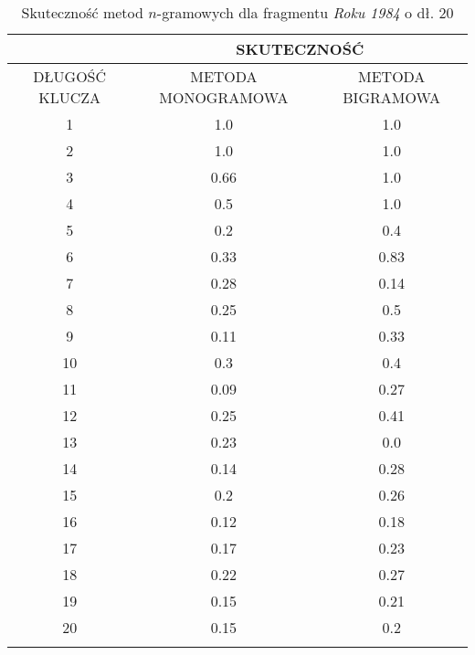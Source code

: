 \documentclass[a4paper]{article}
\theoremstyle{defn}
\theoremstyle{theorem}
\theoremstyle{lemma}
\theoremstyle{cor}
\theoremstyle{fact}
\begin{document}
\begin{center}\begin{longtable}{
|c|c|c|}
\hline   &\multicolumn{2}{|c|}{SKUTECZNOŚĆ} \\ 
\hline  DŁUGOŚĆ KLUCZA & METODA MONOGRAMOWA & METODA BIGRAMOWA\\ \hline
1
 & 1.0 & 1.0\\ \hline
2
 & 1.0 & 1.0\\ \hline
3
 & 0.66 & 1.0\\ \hline
4
 & 0.5 & 1.0\\ \hline
5
 & 0.2 & 0.4\\ \hline
6
 & 0.33 & 0.83\\ \hline
7
 & 0.28 & 0.14\\ \hline
8
 & 0.25 & 0.5\\ \hline
9
 & 0.11 & 0.33\\ \hline
10
 & 0.3 & 0.4\\ \hline
11
 & 0.09 & 0.27\\ \hline
12
 & 0.25 & 0.41\\ \hline
13
 & 0.23 & 0.0\\ \hline
14
 & 0.14 & 0.28\\ \hline
15
 & 0.2 & 0.26\\ \hline
16
 & 0.12 & 0.18\\ \hline
17
 & 0.17 & 0.23\\ \hline
18
 & 0.22 & 0.27\\ \hline
19
 & 0.15 & 0.21\\ \hline
20
 & 0.15 & 0.2\\ \hline
 \caption{Skuteczność metod $n$-gramowych dla fragmentu \textit{Roku 1984} o dł. 20}
\end{longtable}\end{center}
\end{document}

